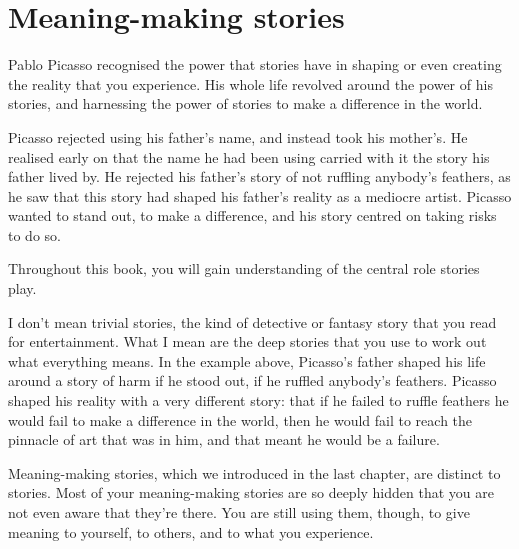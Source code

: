 \section{Meaning-making stories} 
\label{section:stories}
Pablo Picasso recognised the power that stories have in shaping or even creating the reality that you experience. His whole life revolved around the power of his stories, and harnessing the power of stories to make a difference in the world.


Picasso rejected using his father's name, and instead took his mother's. He realised early on that the name he had been using carried with it the story his father lived by. He rejected his father's story of not ruffling anybody's feathers, as he saw that this story had shaped his father's reality as a mediocre artist. Picasso wanted to stand out, to make a difference, and his story centred on taking risks to do so. 


Throughout this book, you will gain understanding of the central role stories play. 


I don't mean trivial stories, the kind of detective or fantasy story that you read for entertainment. What I mean are the deep stories that you use to work out what everything means. In the example above, Picasso's father shaped his life around a story of harm if he stood out, if he ruffled anybody's feathers. Picasso shaped his reality with a very different story: that if he failed to ruffle feathers he would fail to make a difference in the world, then he would fail to reach the pinnacle of art that was in him, and that meant he would be a failure.


Meaning-making stories, which we introduced in the last chapter, are distinct to stories. Most of your meaning-making stories are so deeply hidden that you are not even aware that they're there. You are still using them, though, to give meaning to yourself, to others, and to what you experience.


